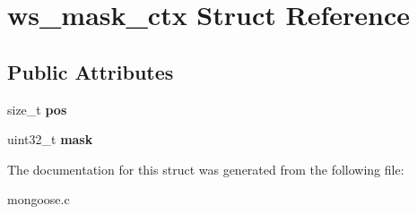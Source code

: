 \hypertarget{structws__mask__ctx}{}\section{ws\+\_\+mask\+\_\+ctx Struct Reference}
\label{structws__mask__ctx}
\subsection*{Public Attributes}
\begin{DoxyCompactItemize}
\item 
\mbox{\label{structws__mask__ctx_a475d1d7c7e1ffef41e9ddd94c738dc93}} 
size\+\_\+t {\bfseries pos}
\item 
\mbox{\label{structws__mask__ctx_a5d0e6527780100ef7cac724b7b7c43ca}} 
uint32\+\_\+t {\bfseries mask}
\end{DoxyCompactItemize}


The documentation for this struct was generated from the following file\+:\begin{DoxyCompactItemize}
\item 
mongoose.\+c\end{DoxyCompactItemize}
